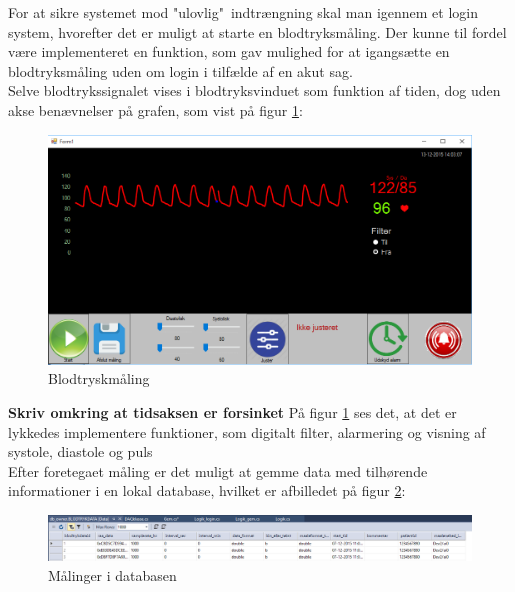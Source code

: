 For at sikre systemet mod "ulovlig"\ indtrængning skal man igennem et login system, hvorefter det er muligt at starte en blodtryksmåling. Der kunne til fordel være implementeret en funktion, som gav mulighed for at igangsætte en blodtryksmåling uden om login i tilfælde af en akut sag.\\ 
Selve blodtrykssignalet vises i blodtryksvinduet som funktion af tiden, dog uden akse benævnelser på grafen, som vist på figur \ref{blodtryk}:

\begin{figure}[H]
	\centering
	\includegraphics[width=1\textwidth]{Figurer/SoftwareImplementering/blodtryk}
	\caption{Blodtryskmåling}
	\label{blodtryk}
\end{figure}

\textbf{Skriv omkring at tidsaksen er forsinket}
På figur \ref{blodtryk} ses det, at det er lykkedes implementere funktioner, som digitalt filter, alarmering og visning af systole, diastole og puls\\
Efter foretegaet måling er det muligt at gemme data med tilhørende informationer i en lokal database, hvilket er afbilledet på figur \ref{databasegem}:

\begin{figure}[H]
	\centering
	\includegraphics[width=1.1\textwidth]{Figurer/SoftwareImplementering/databasegem}
	\caption{Målinger i databasen}
	\label{databasegem}
\end{figure}

